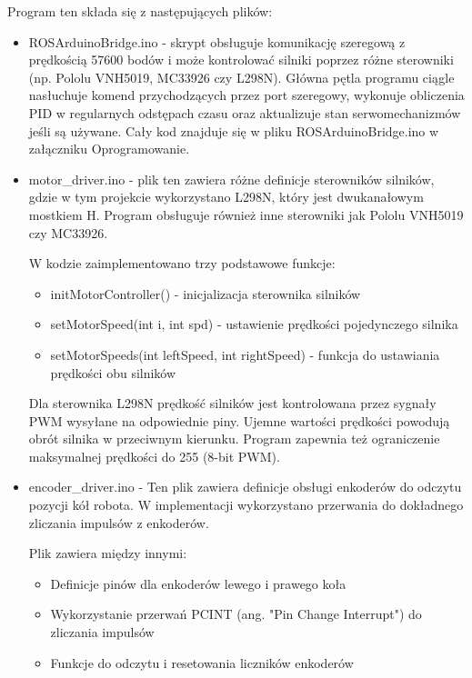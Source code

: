 \documentclass[a4paper,twoside,12pt]{book}
\begin{document}
Program ten składa się z następujących plików:
\begin{itemize}
	\item ROSArduinoBridge.ino -  skrypt obsługuje komunikację szeregową z prędkością 57600 bodów i może kontrolować silniki poprzez różne sterowniki (np. Pololu VNH5019, MC33926 czy L298N). 
	Główna pętla programu ciągle nasłuchuje komend przychodzących przez port szeregowy, wykonuje obliczenia PID w regularnych odstępach czasu oraz aktualizuje stan serwomechanizmów jeśli są używane. Cały kod znajduje się w pliku ROSArduinoBridge.ino w załączniku Oprogramowanie.
	\newpage
	\item motor\_driver.ino - plik ten zawiera różne definicje sterowników silników, gdzie w tym projekcie wykorzystano  L298N, który jest dwukanałowym mostkiem H. Program obsługuje również inne sterowniki jak Pololu VNH5019 czy MC33926.

	W kodzie zaimplementowano trzy podstawowe funkcje:
	\begin{itemize}
	\item initMotorController() - inicjalizacja sterownika silników
	\item setMotorSpeed(int i, int spd) - ustawienie prędkości pojedynczego silnika 
	\item setMotorSpeeds(int leftSpeed, int rightSpeed) - funkcja do ustawiania prędkości obu silników
	\end{itemize}

	Dla sterownika L298N prędkość silników jest kontrolowana przez sygnały PWM wysyłane na odpowiednie piny. Ujemne wartości prędkości powodują obrót silnika w przeciwnym kierunku. Program zapewnia też ograniczenie maksymalnej prędkości do 255 (8-bit PWM).
	\item encoder\_driver.ino - Ten plik zawiera definicje obsługi enkoderów do odczytu pozycji kół robota. W implementacji wykorzystano przerwania do dokładnego zliczania impulsów z enkoderów.

	Plik zawiera między innymi:
	\begin{itemize}
	\item Definicje pinów dla enkoderów lewego i prawego koła
	\item Wykorzystanie przerwań PCINT (ang. "Pin Change Interrupt") do zliczania impulsów
	\item Funkcje do odczytu i resetowania liczników enkoderów
	\end{itemize}

	


\end{itemize}
\end{document}
